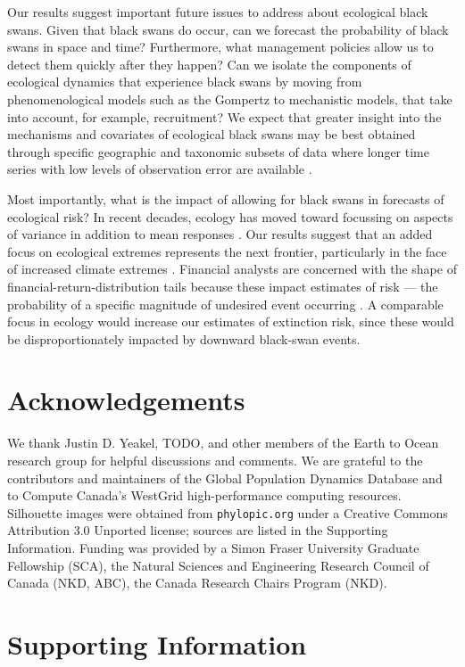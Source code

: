 Our results suggest important future issues to address about ecological black swans. Given that black swans do occur, can we forecast the probability of black swans in space and time? Furthermore, what management policies allow us to detect them quickly after they happen? Can we isolate the components of ecological dynamics that experience black swans by moving from phenomenological models such as the Gompertz to mechanistic models, that take into account, for example, recruitment? We expect that greater insight into the mechanisms and covariates of ecological black swans may be best obtained through specific geographic and taxonomic subsets of data where longer time series with low levels of observation error are available \citep[e.g.][]{segura2013}. 

Most importantly, what is the impact of allowing for black swans in forecasts of ecological risk? 
In recent decades, ecology has moved toward focussing on aspects of variance in addition to mean responses \citep[e.g.][]{loreau2010a, thompson2013}. Our results suggest that an added focus on ecological extremes represents the next frontier, particularly in the face of increased climate extremes \citep{meehl2004,ipcc2012}.
Financial analysts are concerned with the shape of financial-return-distribution tails because these impact estimates of risk --- the probability of a specific magnitude of undesired event occurring \citep{rachev2008}. A comparable focus in ecology would increase our estimates of extinction risk, since these would be disproportionately impacted by downward black-swan events.

\section{Acknowledgements}

We thank Justin D. Yeakel, TODO, and other members of the Earth to Ocean research group for helpful discussions and comments. We are grateful to the contributors and maintainers of the Global Population Dynamics Database and to Compute Canada's WestGrid high-performance computing resources. Silhouette images were obtained from \texttt{phylopic.org} under a Creative Commons Attribution 3.0 Unported license; sources are listed in the Supporting Information. Funding was provided by a Simon Fraser University Graduate Fellowship (SCA), the Natural Sciences and Engineering Research Council of Canada (NKD, ABC), the Canada Research Chairs Program (NKD).

\section{Supporting Information}

